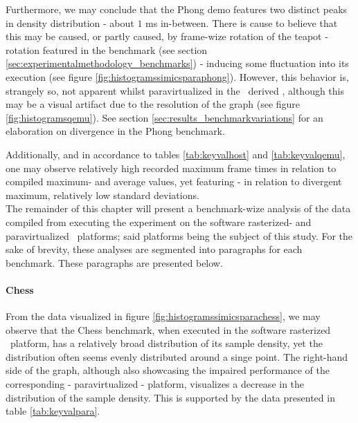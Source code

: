 Furthermore, we may conclude that the Phong demo features two distinct peaks in density distribution - about $1$ ms in-between.
There is cause to believe that this may be caused, or partly caused, by frame-wize rotation of the teapot - rotation featured in the benchmark (see section \ref{sec:experimentalmethodology_benchmarks}) - inducing some fluctuation into its execution (see figure \ref{fig:histogramssimicsparaphong}).
However, this behavior is, strangely so, not apparent whilst paravirtualized in the \dvttermqemu\ derived \dvttermandroidemulator , although this may be a visual artifact due to the resolution of the graph (see figure \ref{fig:histogramsqemu}).
See section \ref{sec:results_benchmarkvariations} for an elaboration on divergence in the Phong benchmark.

Additionally, and in accordance to tables \ref{tab:keyvalhost} and \ref{tab:keyvalqemu}, one may observe relatively high recorded maximum frame times in relation to compiled maximum- and average values, yet featuring - in relation to divergent maximum, relatively low standard deviations.\\

\noindent
The remainder of this chapter will present a benchmark-wize analysis of the data compiled from executing the experiment on the software rasterized- and paravirtualized \dvttermsimics\ platforms; said platforms being the subject of this study.
For the sake of brevity, these analyses are segmented into paragraphs for each benchmark.
These paragraphs are presented below.













\paragraph{Chess}
\label{par:results_chess}
From the data visualized in figure \ref{fig:histogramssimicsparachess}, we may observe that the Chess benchmark, when executed in the software rasterized \dvttermsimics\ platform, has a relatively broad distribution of its sample density, yet the distribution often seems evenly distributed around a singe point. %
The right-hand side of the graph, although also showcasing the impaired performance of the corresponding - paravirtualized - platform, visualizes a decrease in the distribution of the sample density.
This is supported by the data presented in table \ref{tab:keyvalpara}.

